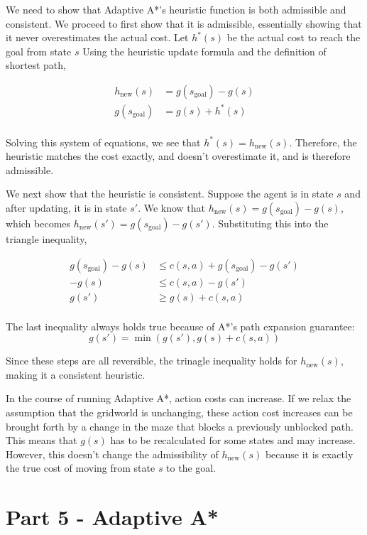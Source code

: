 \documentclass[12pt]{article}
\begin{document}
We need to show that Adaptive A*'s heuristic function is both admissible and consistent.
We proceed to first show that it is admissible,
essentially showing that it never overestimates the actual cost.
Let $h^* (s)$ be the actual cost to reach the goal from state $s$
Using the heuristic update formula and the definition of shortest path,

\begin{align*}
    h_{\text{new}} (s) &= g(s_{\text{goal}}) - g(s) \\
    g(s_{\text{goal}}) &= g(s) + h^*(s) \\
\end{align*}

Solving this system of equations,
we see that 
$h^* (s) = h_{\text{new}} (s)$.
Therefore,
the heuristic matches the cost exactly,
and doesn't overestimate it,
and is therefore admissible.

We next show that the heuristic is consistent.
Suppose the agent is in state $s$ and after updating,
it is in state $s'$.
We know that 
$h_{\text{new}} (s) = g(s_{\text{goal}}) - g(s)$,
which becomes
$h_{\text{new}} (s') = g(s_{\text{goal}}) - g(s')$.
Substituting this into the triangle inequality,

\begin{align*}
g(s_{\text{goal}}) - g(s) & \leq c(s, a) + g(s_{\text{goal}}) - g(s') \\
-g(s) & \leq c(s, a) - g(s') \\
g(s') & \geq g(s) + c(s, a) \\
\end{align*}

The last inequality always holds true because of A*'s path expansion guarantee:
$$g(s') = \min(g(s'), g(s) + c(s, a))$$

Since these steps are all reversible,
the trinagle inequality holds for $h_{\text{new}} (s)$,
making it a consistent heuristic.

In the course of running Adaptive A*,
action costs can increase.
If we relax the assumption that the gridworld is unchanging,
these action cost increases can be brought forth by a change in the maze that blocks a previously unblocked path.
This means that 
$g(s)$ 
has to be recalculated for some states and may increase.
However,
this doesn't change the admissibility of $h_\text{new} (s)$
because it is exactly the true cost of moving from state 
$s$
to the goal.

\section{Part 5 - Adaptive A*}
\end{document}
